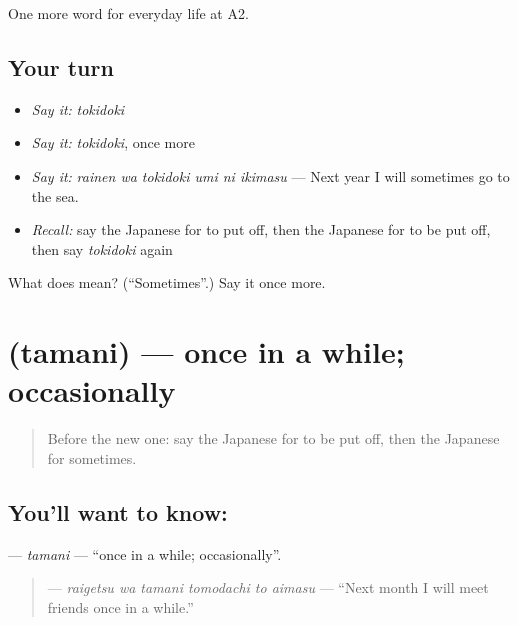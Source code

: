 \begin{grammarlens}[title={What you've built}]
One more word for everyday life at A2.
\end{grammarlens}

\subsection*{Your turn}
\begin{itemize}
\raggedright
  \item \emph{Say it:} \emph{tokidoki}
  \item \emph{Say it:} \emph{tokidoki}, once more
  \item \emph{Say it:} \emph{rainen wa tokidoki umi ni ikimasu} — Next year I will sometimes go to the sea.
  \item \emph{Recall:} say the Japanese for to put off, then the Japanese for to be put off, then say \emph{tokidoki} again
\end{itemize}

\begin{tcolorbox}[breakable,colback=teal!4,colframe=teal!35!black,title={Before you move on}]
What does  mean? (\textquotedblleft{}Sometimes\textquotedblright{}.) Say it once more.
\end{tcolorbox}
\section[\texorpdfstring{\ja{たまに} (tamani)}{たまに (tamani)}]{ (tamani) — once in a while; occasionally}

\label{lesson:JA-C169-tamani}



\begin{quote}
Before the new one: say the Japanese for to be put off, then the Japanese for sometimes.
\end{quote}

\subsection*{You'll want to know: }
\textbf{} — \emph{tamani} — \textquotedblleft{}once in a while; occasionally\textquotedblright{}.

\begin{quote}
\textbf{   } — \emph{raigetsu wa tamani tomodachi to aimasu} — \textquotedblleft{}Next month I will meet friends once in a while.\textquotedblright{}
\end{quote}

